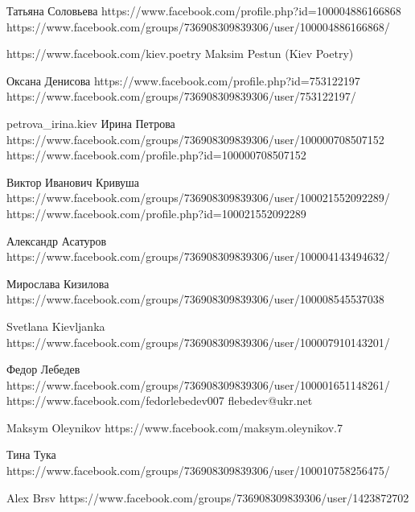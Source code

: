  
 
 
 
 

Татьяна Соловьева
https://www.facebook.com/profile.php?id=100004886166868
https://www.facebook.com/groups/736908309839306/user/100004886166868/

https://www.facebook.com/kiev.poetry
Maksim Pestun (Kiev Poetry)

Оксана Денисова
https://www.facebook.com/profile.php?id=753122197
https://www.facebook.com/groups/736908309839306/user/753122197/

petrova_irina.kiev
Ирина Петрова
https://www.facebook.com/groups/736908309839306/user/100000708507152
https://www.facebook.com/profile.php?id=100000708507152

Виктор Иванович Кривуша
https://www.facebook.com/groups/736908309839306/user/100021552092289/
https://www.facebook.com/profile.php?id=100021552092289

Александр Асатуров
https://www.facebook.com/groups/736908309839306/user/100004143494632/

Мирослава Кизилова
https://www.facebook.com/groups/736908309839306/user/100008545537038

Svetlana Kievljanka
https://www.facebook.com/groups/736908309839306/user/100007910143201/

Федор Лебедев
https://www.facebook.com/groups/736908309839306/user/100001651148261/
https://www.facebook.com/fedorlebedev007
flebedev@ukr.net

Maksym Oleynikov
https://www.facebook.com/maksym.oleynikov.7

Тина Тука
https://www.facebook.com/groups/736908309839306/user/100010758256475/

Alex Brsv
https://www.facebook.com/groups/736908309839306/user/1423872702
